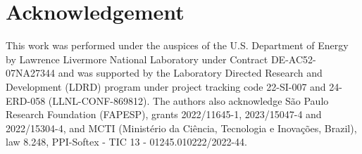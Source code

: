 \section*{Acknowledgement}

This work was performed under the auspices of the U.S. Department of Energy by Lawrence Livermore National Laboratory under Contract DE-AC52-07NA27344 and was supported by the Laboratory Directed Research and Development (LDRD) program under project tracking code 22-SI-007 and 24-ERD-058 (LLNL-CONF-869812). The authors also acknowledge São Paulo Research Foundation (FAPESP), grants 2022/11645-1,
2023/15047-4 and 2022/15304-4, and MCTI (Ministério da Ciência, Tecnologia e Inovações, Brazil), law 8.248, PPI-Softex - TIC 13 - 01245.010222/2022-44.
